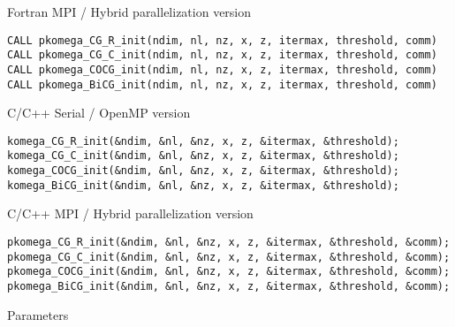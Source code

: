 \documentclass[12pt,titlepage]{article}
\begin{document}
\noindent Fortran MPI / Hybrid parallelization version
\begin{verbatim}
CALL pkomega_CG_R_init(ndim, nl, nz, x, z, itermax, threshold, comm)
CALL pkomega_CG_C_init(ndim, nl, nz, x, z, itermax, threshold, comm)
CALL pkomega_COCG_init(ndim, nl, nz, x, z, itermax, threshold, comm)
CALL pkomega_BiCG_init(ndim, nl, nz, x, z, itermax, threshold, comm)
\end{verbatim}

\noindent C/C++ Serial / OpenMP version
\begin{verbatim}
komega_CG_R_init(&ndim, &nl, &nz, x, z, &itermax, &threshold);
komega_CG_C_init(&ndim, &nl, &nz, x, z, &itermax, &threshold);
komega_COCG_init(&ndim, &nl, &nz, x, z, &itermax, &threshold);
komega_BiCG_init(&ndim, &nl, &nz, x, z, &itermax, &threshold);
\end{verbatim}

\noindent C/C++ MPI / Hybrid parallelization version
\begin{verbatim}
pkomega_CG_R_init(&ndim, &nl, &nz, x, z, &itermax, &threshold, &comm);
pkomega_CG_C_init(&ndim, &nl, &nz, x, z, &itermax, &threshold, &comm);
pkomega_COCG_init(&ndim, &nl, &nz, x, z, &itermax, &threshold, &comm);
pkomega_BiCG_init(&ndim, &nl, &nz, x, z, &itermax, &threshold, &comm);
\end{verbatim}

\noindent Parameters
\end{document}
